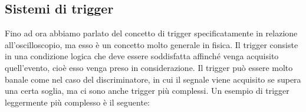 \vspace{-0.2cm}

\subsection{Sistemi di trigger}
Fino ad ora abbiamo parlato del concetto di trigger specificatamente in relazione all'oscilloscopio, ma esso è un concetto molto generale in fisica. Il trigger consiste in una condizione logica che deve essere soddisfatta affinché venga acquisito quell'evento, cioè esso venga preso in considerazione. Il trigger può essere molto banale come nel caso del discriminatore, in cui il segnale viene acquisito se supera una certa soglia, ma ci sono anche trigger più complessi. Un esempio di trigger leggermente più complesso è il seguente:

